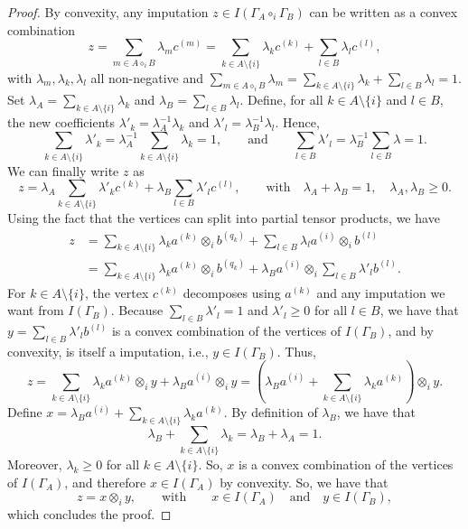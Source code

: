 \documentclass[a4paper,12pt]{amsart}
\begin{document}
\begin{proof}
    \medskip

    By convexity, any imputation \(z \in I(\Gamma_A \circ_i \Gamma_B)\) can be written as a convex combination
    \[
    z = \sum_{m \in A \diamond_i B} \lambda_m c^{(m)} = \sum_{k \in A \setminus \{i\}} \lambda_k c^{(k)} + \sum_{l \in B} \lambda_l c^{(l)}, 
    \]
    with \(\lambda_m, \lambda_k, \lambda_l\) all non-negative and \(\sum_{m \in A \diamond_i B} \lambda_m = \sum_{k \in A \setminus \{i\}} \lambda_k + \sum_{l \in B} \lambda_l = 1\). Set \(\lambda_A = \sum_{k \in A \setminus \{i\}} \lambda_k\) and \(\lambda_B = \sum_{l \in B} \lambda_l\). Define, for all \(k \in A \setminus \{i\}\) and \(l \in B\), the new coefficients \(\lambda'_k = \lambda_A^{-1} \lambda_k\) and \(\lambda'_l = \lambda_B^{-1} \lambda_l\). Hence, 
    \[
    \sum_{k \in A \setminus \{i\}} \lambda'_k = \lambda_A^{-1} \sum_{k \in A \setminus \{i\}} \lambda_k = 1, \qquad \text{and} \qquad \sum_{l \in B} \lambda'_l = \lambda_B^{-1} \sum_{l \in B} \lambda = 1. 
    \]
    We can finally write \(z\) as 
    \[
    z = \lambda_A \sum_{k \in A \setminus \{i\}} \lambda'_k c^{(k)} + \lambda_B \sum_{l \in B} \lambda'_l c^{(l)}, \qquad \text{with} \quad \lambda_A + \lambda_B = 1, \quad \lambda_A, \lambda_B \geq 0. 
    \]
    Using the fact that the vertices can split into partial tensor products, we have 
    \[ \begin{aligned} 
    z & = \sum_{k \in A \setminus \{i\}} \lambda_k a^{(k)} \otimes_i b^{(q_k)} + \sum_{l \in B} \lambda_l a^{(i)} \otimes_i b^{(l)} \\
    & = \sum_{k \in A \setminus \{i\}} \lambda_k a^{(k)} \otimes_i b^{(q_k)} + \lambda_B a^{(i)} \otimes_i \sum_{l \in B} \lambda'_l b^{(l)}. 
    \end{aligned} \]
    For \(k \in A \setminus \{i\}\), the vertex \(c^{(k)}\) decomposes using \(a^{(k)}\) and any imputation we want from \(I(\Gamma_B)\). Because \(\sum_{l \in B}  \lambda'_l = 1\) and \(\lambda'_l \geq 0\) for all \(l \in B\), we have that \(y = \sum_{l \in B} \lambda'_l b^{(l)}\) is a convex combination of the vertices of \(I(\Gamma_B)\), and by convexity, is itself a imputation, i.e., \(y \in I(\Gamma_B)\). Thus, 
    \[
    z = \sum_{k \in A \setminus \{i\}} \lambda_k a^{(k)} \otimes_i y + \lambda_B a^{(i)} \otimes_i y = \left( \lambda_B a^{(i)} +  \sum_{k \in A \setminus \{i\}} \lambda_k a^{(k)} \right) \otimes_i y. 
    \]
    Define \(x = \lambda_B a^{(i)} + \sum_{k \in A \setminus \{i\}} \lambda_k a^{(k)}\). By definition of \(\lambda_B\), we have that 
    \[
    \lambda_B + \sum_{k \in A \setminus \{i\}} \lambda_k = \lambda_B + \lambda_A = 1. 
    \]
    Moreover, \(\lambda_k \geq 0\) for all \(k \in A \setminus \{i\}\). So, \(x\) is a convex combination of the vertices of \(I(\Gamma_A)\), and therefore \(x \in I(\Gamma_A)\) by convexity. So, we have that 
    \[
    z = x \otimes_i y, \qquad \text{with} \qquad x \in I(\Gamma_A) \quad \text{and} \quad y \in I(\Gamma_B), 
    \]
    which concludes the proof. 
\end{proof}
\end{document}

